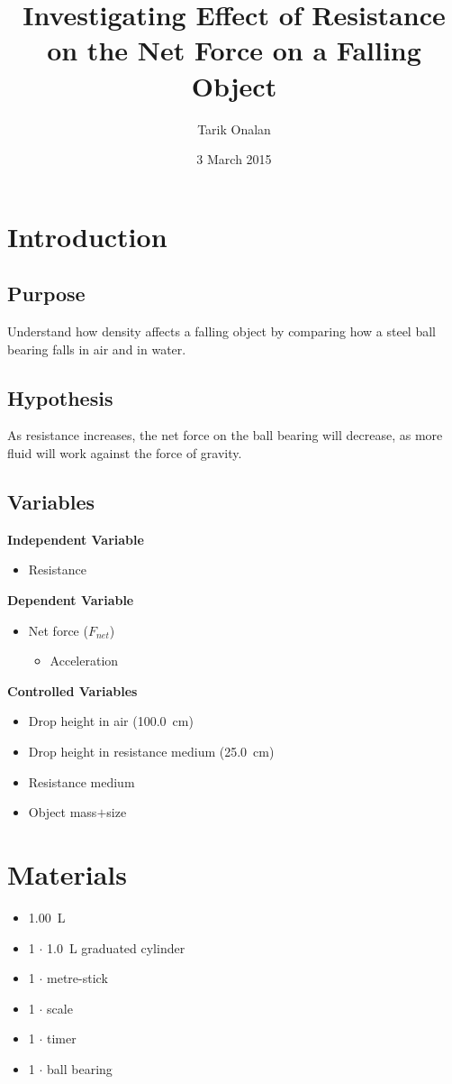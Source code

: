 \documentclass[a4paper]{article}
\title{Investigating Effect of Resistance on the Net Force on a Falling Object}
\date{3 March 2015}
\author{Tarik Onalan}
\begin{document}
    \maketitle
    \section{Introduction}
        \subsection{Purpose}
            Understand how density affects a falling object by comparing how a
            steel ball bearing falls in air and in water.
        \subsection{Hypothesis}
            As resistance increases, the net force on the ball bearing will decrease,
            as more fluid will work against the force of gravity.
        \subsection{Variables}
            \textbf{Independent Variable}
            \begin{itemize}
                \item Resistance
            \end{itemize}
            \textbf{Dependent Variable}
            \begin{itemize}
                \item Net force ($F_{net}$)
                \begin{itemize}
                    \item Acceleration
                \end{itemize}
            \end{itemize}
            \textbf{Controlled Variables}
            \begin{itemize}
                \item Drop height in air (\SI{100.0}{\cm})
                \item Drop height in resistance medium (\SI{25.0}{\cm})
                \item Resistance medium
                \item Object mass$+$size
            \end{itemize}
    \section{Materials}
        \begin{itemize}
            \item \SI{1.00}{\L} 
            \item 1 $\cdot$ \SI{1.0}{\L} graduated cylinder
            \item 1 $\cdot$ metre-stick
            \item 1 $\cdot$ scale
            \item 1 $\cdot$ timer
            \item 1 $\cdot$ ball bearing
        \end{itemize}
\end{document}

